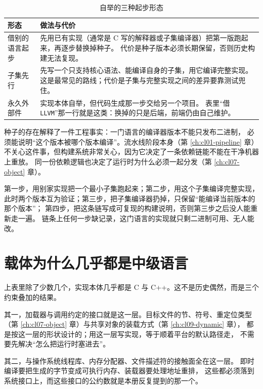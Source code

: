 \documentclass[12pt,a4paper,fontset=fandol]{ctexbook}
\newcommand{\Lang}[1]{\textsf{#1}}
\newcommand{\CL}{\Lang{C}}
\newcommand{\CPP}{\Lang{C++}}
\newcommand{\Tool}[1]{\texttt{#1}}
\begin{document}
\begin{table}[htbp]
\centering
\begin{tabularx}{\textwidth}{@{}>{\raggedright\arraybackslash}p{} X@{}}
\toprule
形态 & 做法与代价 \\
\midrule
借别的语言起步 &
先用已有实现（通常是 \CL{} 写的解释器或子集编译器）把第一版跑起来，再逐步替换掉种子。
代价是种子版本必须长期保留，否则历史构建无法复现。 \\
子集先行 &
先写一个只支持核心语法、能编译自身的子集，用它编译完整实现。
这是最常见的路线；代价是子集与完整实现之间的差异要靠测试兜住。 \\
永久外部件 &
实现本体自举，但代码生成那一步交给另一个项目。
表里“借 \Tool{LLVM}”那一行就是这类：换掉的只是后端，前端仍由自己维护。 \\
\bottomrule
\end{tabularx}
\caption{自举的三种起步形态}\label{tab:apC-seed}
\end{table}

种子的存在解释了一件工程事实：一门语言的编译器版本不能只发布二进制，
必须能说明“这个版本被哪个版本编译”。流水线阶段本身（第 \ref{ch:cl01-pipeline} 章）
不关心这件事，但构建系统非常关心，因为它决定了一条依赖链能不能在干净机器上重放。
同一份依赖逻辑也决定了运行时为什么必须一起分发（第 \ref{ch:cl07-object} 章）。

\begin{flow}[title=一条种子链通常要走到的四步]
第一步，用别家实现把一个最小子集跑起来；第二步，用这个子集编译完整实现，
此时两个版本互为验证；第三步，把子集编译器扔掉，只保留“能编译当前版本的那个版本”；
第四步，把这条链写成可复现的构建说明，否则第三步之后没人能重新走一遍。
链条上任何一步缺记录，这门语言的实现就只剩二进制可用、无人能改。
\end{flow}

\section{载体为什么几乎都是中级语言}

上表里除了少数几个，实现本体几乎都是 \CL{} 与 \CPP{}。这不是历史偶然，而是三个约束叠加的结果。

其一，加载器与调用约定的接口就是这一层。目标文件的节、符号、重定位类型
（第 \ref{ch:cl07-object} 章）与共享对象的装载方式（第 \ref{ch:cl09-dynamic} 章），
都是按这一层的形状设计的；用这一层写实现，等于顺着平台的默认路径走，
不需要先解决“怎么把运行时塞进去”。

其二，与操作系统线程库、内存分配器、文件描述符的接触面全在这一层。
即时编译要把生成的字节变成可执行内存、装载器要处理地址重排，
这些都必须落到系统接口上，而这些接口的公约数就是本册反复提到的那一个。
\end{document}
